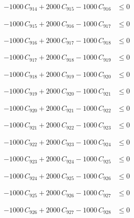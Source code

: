 \documentclass[a4paper,11pt]{article}
\begin{document}
\begin{align}
-1000\,C_{914} + 2000\,C_{915} - 1000\,C_{916} &\leq 0 \nonumber
\end{align}

\begin{align}
-1000\,C_{915} + 2000\,C_{916} - 1000\,C_{917} &\leq 0 \nonumber
\end{align}

\begin{align}
-1000\,C_{916} + 2000\,C_{917} - 1000\,C_{918} &\leq 0 \nonumber
\end{align}

\begin{align}
-1000\,C_{917} + 2000\,C_{918} - 1000\,C_{919} &\leq 0 \nonumber
\end{align}

\begin{align}
-1000\,C_{918} + 2000\,C_{919} - 1000\,C_{920} &\leq 0 \nonumber
\end{align}

\begin{align}
-1000\,C_{919} + 2000\,C_{920} - 1000\,C_{921} &\leq 0 \nonumber
\end{align}

\begin{align}
-1000\,C_{920} + 2000\,C_{921} - 1000\,C_{922} &\leq 0 \nonumber
\end{align}

\begin{align}
-1000\,C_{921} + 2000\,C_{922} - 1000\,C_{923} &\leq 0 \nonumber
\end{align}

\begin{align}
-1000\,C_{922} + 2000\,C_{923} - 1000\,C_{924} &\leq 0 \nonumber
\end{align}

\begin{align}
-1000\,C_{923} + 2000\,C_{924} - 1000\,C_{925} &\leq 0 \nonumber
\end{align}

\begin{align}
-1000\,C_{924} + 2000\,C_{925} - 1000\,C_{926} &\leq 0 \nonumber
\end{align}

\begin{align}
-1000\,C_{925} + 2000\,C_{926} - 1000\,C_{927} &\leq 0 \nonumber
\end{align}

\begin{align}
-1000\,C_{926} + 2000\,C_{927} - 1000\,C_{928} &\leq 0 \nonumber
\end{align}
\end{document}
